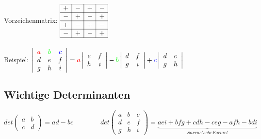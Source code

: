 	Vorzeichenmatrix: $\begin{array}{|c|c|c|c|}
		\hline + & - & + & - \\
		\hline - & + & - & + \\
		\hline + & - & + & - \\
		\hline - & + & - & + \\
		\hline \end{array}$ \\ \\

	Beispiel: $\left|\begin{array}{ccc}
		\color{red}a & \color{green}b & \color{blue}c \\
		d & e & f \\
		g & h & i \end{array}\right| 
	= {\color{red}a} \left|\begin{array}{cc}
		e & f \\
		h & i \end{array}\right| 
	- {\color{green}b} \left|\begin{array}{cc}
		d & f \\
		g & i \end{array}\right|
	+ {\color{blue}c} \left|\begin{array}{cc}
		d & e \\
		g & h \end{array}\right|$ \\

\subsection{Wichtige Determinanten}
	$det\left(\begin{array}{cc}
		a & b \\
		c & d \end{array}\right)
	= ad - bc \qquad \qquad
	det\left(\begin{array}{ccc}
		a & b & c \\
		d & e & f \\
		g & h & i \end{array}\right)
	= \underbrace{aei + bfg + cdh - ceg - afh - bdi}_{Sarrus'sche Formel}$

